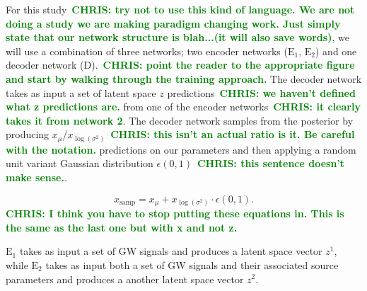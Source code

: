 \documentclass[%
showpacs,
 amsmath,amssymb,
 aps,
 twocolumn,
 prl,
 reprint,
floatfix,
]{revtex4-1}
\newcommand{\chris}[1]{\textbf{\textcolor{green}{CHRIS: #1}}}
\begin{document}
%
%
For this study~\chris{try not to use this kind of language. We are not doing a
study we are making paradigm changing work. Just simply state that our network
structure is blah...(it will also save words)}, we will use a combination of
three networks; two encoder networks ($\textrm{E}_1$, $\textrm{E}_2$) and one
decoder network (D).~\chris{point the reader to the appropriate figure and
start by walking through the training approach.} The decoder network takes as
input a set of latent space $z$ predictions~\chris{we haven't defined what z
predictions are.} from one of the encoder networks~\chris{it clearly takes it
from network 2}.  The decoder network samples from the posterior by producing
$x_{\mu}$/$x_{\log{(\sigma^{2})}}$~\chris{this isn't an actual ratio is it. Be
careful with the notation.} predictions on our parameters and then applying a
random unit variant Gaussian distribution $\epsilon(0,1)$~\chris{this sentence
doesn't make sense.}.

\begin{equation}
    x_{\textrm{samp}} = x_{\mu} + x_{\log{(\sigma^{2})}} \cdot \epsilon(0,1).\label{eq:x_calc}
\end{equation}
\chris{I think you have to stop putting these equations in. This is the same as
the last one but with x and not z.}

$\textrm{E}_1$ takes as 
input a set of \ac{GW} signals and produces a latent space vector $z^1$, while $\textrm{E}_2$ 
takes as input both a set of GW signals and their associated source parameters 
and produces a another latent space vector $z^2$.
\end{document}
